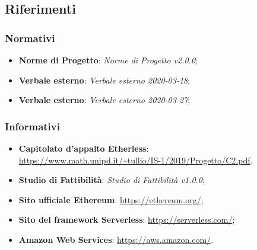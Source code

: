 \subsection{Riferimenti}
\subsubsection{Normativi}
\begin{itemize}
	\item \textbf{Norme di Progetto}: \textit{Norme di Progetto v2.0.0};
	\item \textbf{Verbale esterno}: \textit{Verbale esterno 2020-03-18};
	\item \textbf{Verbale esterno}: \textit{Verbale esterno 2020-03-27};
\end{itemize}

\subsubsection{Informativi}
\begin{itemize}
	\item \textbf{Capitolato d'appalto Etherless}:\\\url{https://www.math.unipd.it/~tullio/IS-1/2019/Progetto/C2.pdf}.
	\item \textbf{Studio di Fattibilità}: \textit{Studio di Fattibilità v1.0.0};
	\item \textbf{Sito ufficiale Ethereum}: \url{https://ethereum.org/};
	\item \textbf{Sito del framework Serverless}: \url{https://serverless.com/};
	\item \textbf{Amazon Web Services}: \url{https://aws.amazon.com/}.
\end{itemize}